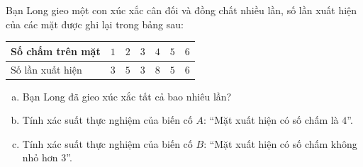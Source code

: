\begin{bt}%
Bạn Long gieo một con xúc xắc cân đối và đồng chất nhiều lần, số lần xuất hiện của các mặt được ghi lại trong bảng sau:
\begin{center}
\begin{tabular}{|l|c|c|c|c|c|c|}
\hline
Số chấm trên mặt & $1$ & $2$ & $3$ & $4$ & $5$ & $6$ \\ \hline
Số lần xuất hiện & $3$ & $5$ & $3$ & $8$ & $5$ & $6$ \\ \hline
\end{tabular}
\end{center}
\begin{enumerate}[a)]
    \item Bạn Long đã gieo xúc xắc tất cả bao nhiêu lần?
    \item Tính xác suất thực nghiệm của biến cố $A$: ``Mặt xuất hiện có số chấm là $4$''.
    \item Tính xác suất thực nghiệm của biến cố $B$: ``Mặt xuất hiện có số chấm không nhỏ hơn $3$''.
\end{enumerate}
\end{bt}

